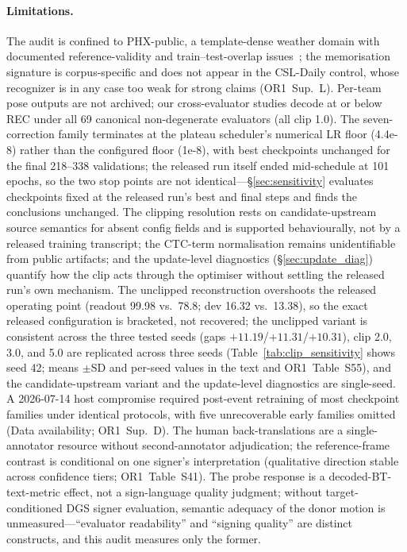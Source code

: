 \documentclass[pdflatex,sn-chicago]{sn-jnl}
\begin{document}
\paragraph{Limitations.}
The audit is confined to PHX-public, a template-dense weather domain with documented reference-validity and train--test-overlap issues~\cite{czehmann2026sacred,alkain2026critical}; the memorisation signature is corpus-specific and does not appear in the CSL-Daily control, whose recognizer is in any case too weak for strong claims (OR1~Sup.~L). Per-team pose outputs are not archived; our cross-evaluator studies decode at or below REC under all 69 canonical non-degenerate evaluators (all clip 1.0). The seven-correction family terminates at the plateau scheduler's numerical LR floor (4.4e-8) rather than the configured floor (1e-8), with best checkpoints unchanged for the final 218--338 validations; the released run itself ended mid-schedule at 101 epochs, so the two stop points are not identical---\S\ref{sec:sensitivity} evaluates checkpoints fixed at the released run's best and final steps and finds the conclusions unchanged. The clipping resolution rests on candidate-upstream source semantics for absent config fields and is supported behaviourally, not by a released training transcript; the CTC-term normalisation remains unidentifiable from public artifacts; and the update-level diagnostics (\S\ref{sec:update_diag}) quantify how the clip acts through the optimiser without settling the released run's own mechanism. The unclipped reconstruction overshoots the released operating point (readout 99.98 vs.\ 78.8; dev 16.32 vs.\ 13.38), so the exact released configuration is bracketed, not recovered; the unclipped variant is consistent across the three tested seeds (gaps $+11.19$/$+11.31$/$+10.31$), clip 2.0, 3.0, and 5.0 are replicated across three seeds (Table~\ref{tab:clip_sensitivity} shows seed 42; means $\pm$SD and per-seed values in the text and OR1~Table~S55), and the candidate-upstream variant and the update-level diagnostics are single-seed. A 2026-07-14 host compromise required post-event retraining of most checkpoint families under identical protocols, with five unrecoverable early families omitted (Data availability; OR1~Sup.~D). The human back-translations are a single-annotator resource without second-annotator adjudication; the reference-frame contrast is conditional on one signer's interpretation (qualitative direction stable across confidence tiers; OR1~Table~S41). The probe response is a decoded-BT-text-metric effect, not a sign-language quality judgment; without target-conditioned DGS signer evaluation, semantic adequacy of the donor motion is unmeasured---``evaluator readability'' and ``signing quality'' are distinct constructs, and this audit measures only the former.
\end{document}
